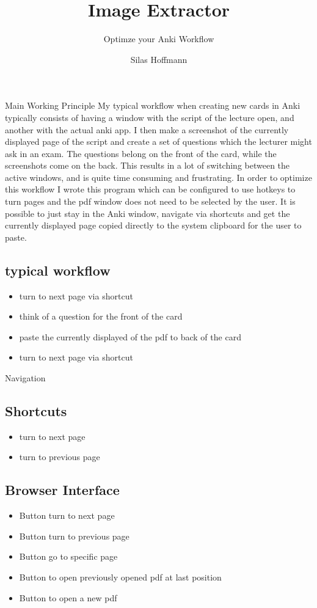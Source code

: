 \documentclass[pdf]{beamer}
\title{Image Extractor}
\subtitle{Optimze your Anki Workflow}
\author{
    Silas Hoffmann
}
\begin{document}
\maketitle

\begin{frame}{Main Working Principle}
    My typical workflow when creating new cards in Anki typically consists of having a window with the script of the lecture open, and another with the actual anki app. 
    I then make a screenshot of the currently displayed page of the script and create a set of questions which the lecturer might ask in an exam. The questions belong
    on the front of the card, while the screenshots come on the back. This results in a lot of switching between the active windows, and is quite time consuming and frustrating.
    In order to optimize this workflow I wrote this program which can be configured to use hotkeys to turn pages and the pdf window does not need to be selected by the user.
    It is possible to just stay in the Anki window, navigate via shortcuts and get the currently displayed page copied directly to the system clipboard for the user to paste.

    \subsection{typical workflow}
    \begin{itemize}
        \item turn to next page via shortcut
        \item think of a question for the front of the card
        \item paste the currently displayed of the pdf to back of the card
        \item turn to next page via shortcut
    \end{itemize}
\end{frame}

\begin{frame}{Navigation}
    \subsection{Shortcuts}
    \begin{itemize}
        \item turn to next page
        \item turn to previous page
    \end{itemize}

    \subsection{Browser Interface}
    \begin{itemize}
        \item Button turn to next page
        \item Button turn to previous page
        \item Button go to specific page
        \item Button to open previously opened pdf at last position
        \item Button to open a new pdf 
    \end{itemize}

\end{frame}
\end{document}

